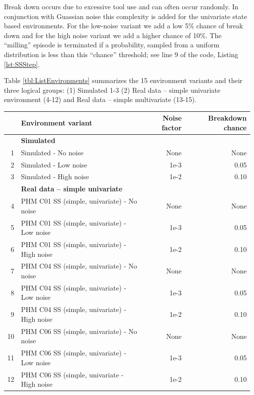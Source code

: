 \documentclass[a4paper, 12pt]{article}
\newcommand{\rowspace}[1]{\renewcommand{\arraystretch}{#1}}
\begin{document}
Break down occurs due to excessive tool use and can often occur randomly. In conjunction with Guassian noise this complexity is added for the univariate state based environments. For the low-noise variant we add a low 5\% chance of break down and for the high noise variant we add a higher chance of 10\%. The ``milling'' episode is terminated if a probability, sampled from a uniform distribution is less than this ``chance'' threshold; see line 9 of the code, Listing \ref{lst:SSStep}.

Table \ref{tbl:ListEnvironments} summarizes the 15 environment variants and their three logical groups: (1) Simulated 1-3 (2) Real data -- simple univariate environment (4-12) and Real data -- simple multivariate (13-15).

\begin{table}
	\sffamily
	\rowspace{1.3}
	\begin{tabular}{@{}r l rr@{}} \arrayrulecolor{black!40}\toprule 
		 & Environment variant & Noise factor & Breakdown chance \\ \midrule
		 & \multicolumn{3}{l}{\textbf{Simulated}}\\
		1 & Simulated - No noise  & None & None \\
		2 & Simulated - Low noise & 1e-3 & 0.05 \\
		3 & Simulated  - High noise & 1e-2 & 0.10 \\ \midrule
		\rule{0pt}{1.5\normalbaselineskip}
		 & \multicolumn{3}{l}{\textbf{Real data -- simple univariate}} \\
		4 & PHM C01 SS (simple, univariate) - No noise & None & None \\
		5 & PHM C01 SS (simple, univariate) - Low noise & 1e-3 & 0.05 \\
		6 & PHM C01 SS (simple, univariate) - High noise & 1e-2 & 0.10 \\ \hdashline
		
		7 & PHM C04 SS (simple, univariate) - No noise & None & None \\
		8 & PHM C04 SS (simple, univariate) - Low noise & 1e-3 & 0.05 \\
		9 & PHM C04 SS (simple, univariate) - High noise & 1e-2 & 0.10 \\ \hdashline
		
		10 & PHM C06 SS (simple, univariate) - No noise & None & None \\
		11 & PHM C06 SS (simple, univariate) - Low noise & 1e-3 & 0.05 \\
		12 & PHM C06 SS (simple, univariate - High noise & 1e-2 & 0.10 \\ \midrule
		

\end{tabular}
\end{table}
\end{document}
